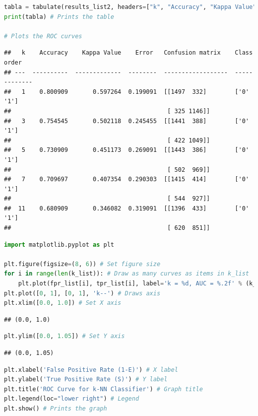 \documentclass[
]{article}
\begin{document}
\begin{lstlisting}[language=Python]
tabla = tabulate(results_list2, headers=["k", "Accuracy", "Kappa Value", "Error ", "Confusion matrix", "Class order"])
print(tabla) # Prints the table

# Plots the ROC curves
\end{lstlisting}

\begin{lstlisting}
##   k    Accuracy    Kappa Value    Error   Confusion matrix    Class order
## ---  ----------  -------------  --------  ------------------  -------------
##   1    0.800909       0.597264  0.199091  [[1497  332]        ['0' '1']
##                                            [ 325 1146]]
##   3    0.754545       0.502118  0.245455  [[1441  388]        ['0' '1']
##                                            [ 422 1049]]
##   5    0.730909       0.451173  0.269091  [[1443  386]        ['0' '1']
##                                            [ 502  969]]
##   7    0.709697       0.407354  0.290303  [[1415  414]        ['0' '1']
##                                            [ 544  927]]
##  11    0.680909       0.346082  0.319091  [[1396  433]        ['0' '1']
##                                            [ 620  851]]
\end{lstlisting}

\begin{lstlisting}[language=Python]
import matplotlib.pyplot as plt

plt.figure(figsize=(8, 6)) # Set figure size
for i in range(len(k_list)): # Draw as many curves as items in k_list
    plt.plot(fpr_list[i], tpr_list[i], label='k = %d, AUC = %.2f' % (k_list[i], roc_auc_list[i])) # Plots the curve for each k and sets the AUC values for the legend
plt.plot([0, 1], [0, 1], 'k--') # Draws axis
plt.xlim([0.0, 1.0]) # Set X axis
\end{lstlisting}

\begin{lstlisting}
## (0.0, 1.0)
\end{lstlisting}

\begin{lstlisting}[language=Python]
plt.ylim([0.0, 1.05]) # Set Y axis
\end{lstlisting}

\begin{lstlisting}
## (0.0, 1.05)
\end{lstlisting}

\begin{lstlisting}[language=Python]
plt.xlabel('False Positive Rate (1-E)') # X label
plt.ylabel('True Positive Rate (S)') # Y label
plt.title('ROC Curve for k-NN Classifier') # Graph title
plt.legend(loc="lower right") # Legend
plt.show() # Prints the graph
\end{lstlisting}
\end{document}
